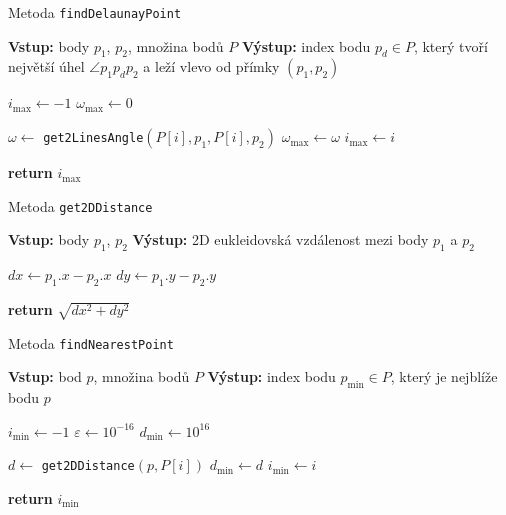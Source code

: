 \begin{algorithm}
    \caption{Metoda \texttt{findDelaunayPoint}}
    \begin{algorithmic}[1]
        \STATE \textbf{Vstup:} body $p_1$, $p_2$, množina bodů $P$
        \STATE \textbf{Výstup:} index bodu $p_d \in P$, který tvoří největší úhel $\angle p_1 p_d p_2$ a leží vlevo od přímky $(p_1, p_2)$

        \STATE $i_{\max} \gets -1$ 
        \STATE $\omega_{\max} \gets 0$

                \STATE $\omega \gets$ \texttt{get2LinesAngle}$(P[i], p_1, P[i], p_2)$
                \IF{$\omega > \omega_{\max}$}
                    \STATE $\omega_{\max} \gets \omega$
                    \STATE $i_{\max} \gets i$
                \ENDIF
            \ENDIF
        \ENDFOR

        \STATE \textbf{return} $i_{\max}$
    \end{algorithmic}
\end{algorithm}


\begin{algorithm}
    \caption{Metoda \texttt{get2DDistance}}
    \begin{algorithmic}[1]
        \STATE \textbf{Vstup:} body $p_1$, $p_2$
        \STATE \textbf{Výstup:} 2D eukleidovská vzdálenost mezi body $p_1$ a $p_2$

        \STATE $dx \gets p_1.x - p_2.x$
        \STATE $dy \gets p_1.y - p_2.y$

        \STATE \textbf{return} $\sqrt{dx^2 + dy^2}$
    \end{algorithmic}
\end{algorithm}


\begin{algorithm}
    \caption{Metoda \texttt{findNearestPoint}}
    \begin{algorithmic}[1]
        \STATE \textbf{Vstup:} bod $p$, množina bodů $P$
        \STATE \textbf{Výstup:} index bodu $p_{\min} \in P$, který je nejblíže bodu $p$

        \STATE $i_{\min} \gets -1$
        \STATE $\varepsilon \gets 10^{-16}$ 
        \STATE $d_{\min} \gets 10^{16}$ 

                \STATE $d \gets$ \texttt{get2DDistance}$(p, P[i])$
                    \STATE $d_{\min} \gets d$
                    \STATE $i_{\min} \gets i$
                \ENDIF
            \ENDIF
        \ENDFOR

        \STATE \textbf{return} $i_{\min}$
    \end{algorithmic}
\end{algorithm}

